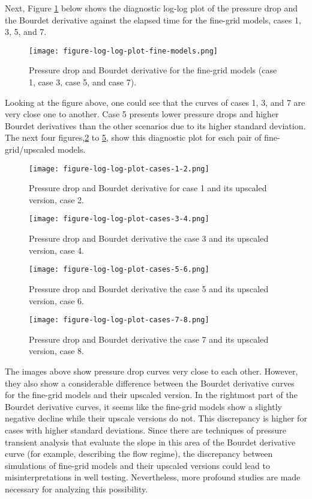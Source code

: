 Next, Figure \ref{figure-log-log-plot-fine-models} below shows the diagnostic log-log plot of the pressure drop and the Bourdet derivative against the elapsed time for the fine-grid models, cases 1, 3, 5, and 7.
%
\begin{figure}[H]
	\centering
	\texttt{[image: figure-log-log-plot-fine-models.png]}
	\caption{Pressure drop and Bourdet derivative for the fine-grid models (case 1, case 3, case 5, and case 7).}
	\label{figure-log-log-plot-fine-models}
\end{figure}
\noindent
%
Looking at the figure above, one could see that the curves of cases 1, 3, and 7 are very close one to another.
%
Case 5 presents lower pressure drops and higher Bourdet derivatives than the other scenarios due to its higher standard deviation.
%
The next four figures,\ref{figure-log-log-plot-cases-1-2} to \ref{figure-log-log-plot-cases-7-8}, show this diagnostic plot for each pair of fine-grid/upscaled models.
%
\begin{figure}[H]
	\centering
	\texttt{[image: figure-log-log-plot-cases-1-2.png]}
	\caption{Pressure drop and Bourdet derivative for case 1 and its upscaled version, case 2.}
	\label{figure-log-log-plot-cases-1-2}
\end{figure}
%
\begin{figure}[H]
	\centering
	\texttt{[image: figure-log-log-plot-cases-3-4.png]}
	\caption{Pressure drop and Bourdet derivative the case 3 and its upscaled version, case 4.}
	\label{figure-log-log-plot-cases-3-4}
\end{figure}
%
\begin{figure}[H]
	\centering
	\texttt{[image: figure-log-log-plot-cases-5-6.png]}
	\caption{Pressure drop and Bourdet derivative the case 5 and its upscaled version, case 6.}
	\label{figure-log-log-plot-cases-5-6}
\end{figure}
%
\begin{figure}[H]
	\centering
	\texttt{[image: figure-log-log-plot-cases-7-8.png]}
	\caption{Pressure drop and Bourdet derivative the case 7 and its upscaled version, case 8.}
	\label{figure-log-log-plot-cases-7-8}
\end{figure}
\noindent
%
The images above show pressure drop curves very close to each other.
%
However, they also show a considerable difference between the Bourdet derivative curves for the fine-grid models and their upscaled version.
%
In the rightmost part of the Bourdet derivative curves, it seems like the fine-grid models show a slightly negative decline while their upscale versions do not.
%
This discrepancy is higher for cases with higher standard deviations.
%
Since there are techniques of pressure transient analysis that evaluate the slope in this area of the Bourdet derivative curve (for example, describing the flow regime), the discrepancy between simulations of fine-grid models and their upscaled versions could lead to misinterpretations in well testing.
%
Nevertheless, more profound studies are made necessary for analyzing this possibility.
